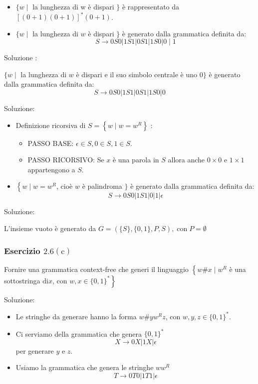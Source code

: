\begin{itemize}
    \item $\{w \mid$ la lunghezza di w è dispari $\}$ è rappresentato da $[(0+1)(0+1)]^{*}(0+1)$.
    \item  $\{w \mid$ la lunghezza di $w$ è dispari $\}$ è generato dalla grammatica definita da:
$$
S \rightarrow 0 S 0|1 S 1| 0 S 1|1 S 0| 0 \mid 1
$$
\end{itemize}

Soluzione :

$\{w \mid$ la lunghezza di $w$ è dispari e il suo simbolo centrale è uno 0$\}$ è generato dalla grammatica definita da:
$$
S \rightarrow 0 S 0|1 S 1| 0 S 1|1 S 0| 0
$$

Soluzione:

\begin{itemize}
    \item Definizione ricorsiva di $S=\left\{w \mid w=w^{R}\right\}$ :
    \begin{itemize}
        \item PASSO BASE: $\epsilon \in S, 0 \in S, 1 \in S$.
        \item PASSO RICORSIVO: Se $x$ è una parola in $S$ allora anche $0 \times 0$ e $1 \times 1$ appartengono a $S$.
    \end{itemize}
    \item  $\left\{w \mid w=w^{R}\right.$, cioè $w$ è palindroma $\}$ è generato dalla grammatica definita da:
$$
S \rightarrow 0 S 0|1 S 1| 0|1| \epsilon
$$
\end{itemize}

Soluzione:

L'insieme vuoto è generato da $G=(\{S\},\{0,1\}, P, S), \operatorname{con} P=\emptyset$

\subsubsection{Esercizio $2.6(\mathrm{c})$}
Fornire una grammatica context-free che generi il linguaggio $\left\{w \# x \mid w^{R}\right.$ è una sottostringa $\mathrm{di} x$, con $\left.w, x \in\{0,1\}^{*}\right\}$

Soluzione:
\begin{itemize}
    \item Le stringhe da generare hanno la forma $w \# y w^{R} z$, con $w, y, z \in\{0,1\}^{*}$.
    \item Ci serviamo della grammatica che genera $\{0,1\}^{*}$
$$
X \rightarrow 0 X|1 X| \epsilon
$$
per generare $y$ e $z$.
    \item Usiamo la grammatica che genera le stringhe $w w^{R}$
$$
T \rightarrow 0 T 0|1 T 1| \epsilon
$$
\end{itemize}

